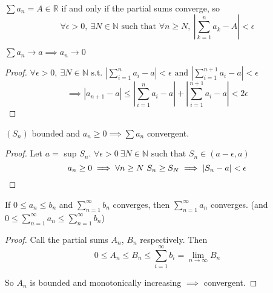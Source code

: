 \setcounter{lecture}{2}

\pagebreak

\label{sub:series}

~

\begin{definition}
$\sum a_n = A \in \mathbb{R}$ if and only if the partial sums converge, so \\[-0.3cm]\[\forall \epsilon > 0,~\exists N \in \mathbb{N} \text{ such that } \forall n \geq N,~ \left|\sum_{k=1}^n a_k-A\right| < \epsilon\]
\end{definition}


\begin{theorem}
$\sum a_n \to a \implies a_n \to 0$	
\end{theorem}
\begin{proof}
$\forall \epsilon >0,~\exists N \in\mathbb{N} \text{ s.t. }\left|\sum_{i=1}^{n}a_i - a\right| < \epsilon \text{ and } \left|\sum_{i=1}^{n+1}a_i - a\right| < \epsilon$
\[\implies |a_{n+1} - a| \leq \left|\sum_{i=1}^{n}a_i - a\right| + \left|\sum_{i=1}^{n+1}a_i - a\right|  < 2\epsilon \]
\end{proof}\vspace*{5pt}

\begin{theorem}
$(S_n)$ bounded and $a_n \geq 0 \implies \sum a_n$ convergent.
\end{theorem}
\begin{proof}
	Let $a = $ sup $S_n$. $\forall \epsilon > 0~ \exists N \in \mathbb{N} \text{ such that }S_n \in (a-\epsilon,a)$
	\[a_n \geq 0 \implies \forall n\geq N~ S_n \geq S_N \implies |S_n - a| < \epsilon\qedhere\]
\end{proof}\vspace*{5pt}


\vspace*{10pt}

\begin{theorem}[Comparison I]
If $0 \leq a_n \leq b_n$ and $\sum_{n=1}^{\infty} b_n$ converges, then $\sum_{n=1}^{\infty} a_n$ converges.	 (and $0 \leq \sum_{n=1}^{\infty}a_n \leq \sum_{n=1}^{\infty}b_n$)
\end{theorem}

\begin{proof}
Call the partial sums $A_n$, $B_n$ respectively. Then
\[0 \leq A_n \leq B_n \leq \sum_{i=1}^{\infty} b_i = \lim_{n\to \infty}B_n\]	

So $A_n$ is bounded and monotonically increasing $\implies$ convergent. 
\end{proof}\vspace*{10pt}


